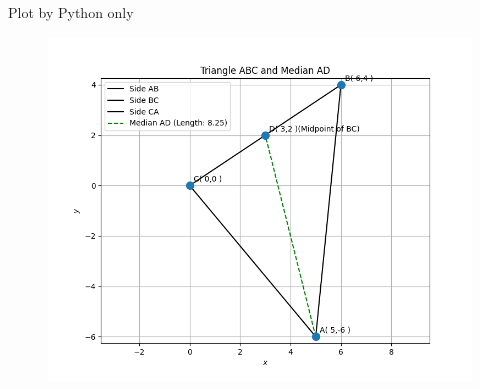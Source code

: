 \documentclass{beamer}
\begin{document}
 \begin{frame}{Plot by Python only}
\begin{figure}[H]
        \centering
        \includegraphics[width=0.7\columnwidth]{../figs/fig2.png}
        \caption{}
        \label{fig:2}
    \end{figure}
\end{frame}

 
\end{document}
